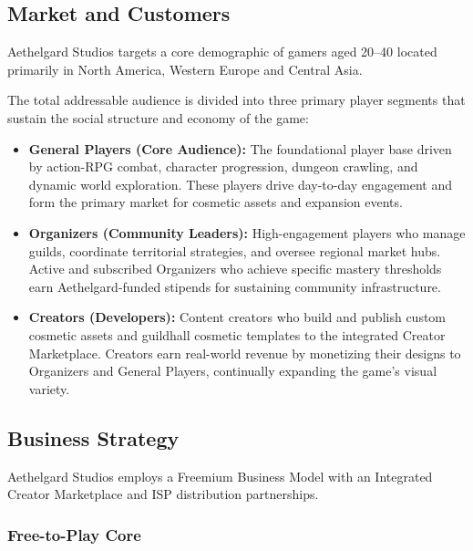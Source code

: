 \subsection{Market and Customers}
Aethelgard Studios targets a core demographic of gamers aged 20--40 located primarily in North America, Western Europe and Central
Asia.

The total addressable audience is divided into three primary player segments that sustain the social structure and economy of the
game:
\begin{itemize}
  \item \textbf{General Players (Core Audience):} The foundational player base driven by action-RPG combat, character progression,
  dungeon crawling, and dynamic world exploration. These players drive day-to-day engagement and form the primary market for
  cosmetic assets and expansion events.
  \item \textbf{Organizers (Community Leaders):} High-engagement players who manage guilds, coordinate territorial strategies,
  and oversee regional market hubs. Active and subscribed Organizers who achieve specific mastery thresholds earn Aethelgard-funded
  stipends for sustaining community infrastructure.
  \item \textbf{Creators (Developers):} Content creators who build and publish custom cosmetic assets and guildhall cosmetic
  templates to the integrated Creator Marketplace. Creators earn real-world revenue by monetizing their designs to Organizers and
  General Players, continually expanding the game's visual variety.
\end{itemize}

\subsection{Business Strategy}
Aethelgard Studios employs a Freemium Business Model with an Integrated Creator Marketplace and ISP distribution partnerships.

\subsubsection{Free-to-Play Core}

